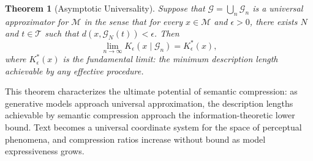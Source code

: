 \documentclass[12pt,a4paper]{article}
\newtheorem{theorem}{Theorem}[section]
\theoremstyle{definition}
\theoremstyle{remark}
\begin{document}
\begin{theorem}[Asymptotic Universality]
Suppose that $\mathcal{G} = \bigcup_n \mathcal{G}_n$ is a universal approximator for $\mathcal{M}$ in the sense that for every $x \in \mathcal{M}$ and $\epsilon > 0$, there exists $N$ and $t \in \mathcal{T}$ such that $d(x, \mathcal{G}_N(t)) < \epsilon$. Then
\[
\lim_{n \to \infty} K_\epsilon(x \mid \mathcal{G}_n) = K_\epsilon^*(x),
\]
where $K_\epsilon^*(x)$ is the fundamental limit: the minimum description length achievable by any effective procedure.
\end{theorem}

This theorem characterizes the ultimate potential of semantic compression: as generative models approach universal approximation, the description lengths achievable by semantic compression approach the information-theoretic lower bound. Text becomes a universal coordinate system for the space of perceptual phenomena, and compression ratios increase without bound as model expressiveness grows.
\end{document}
